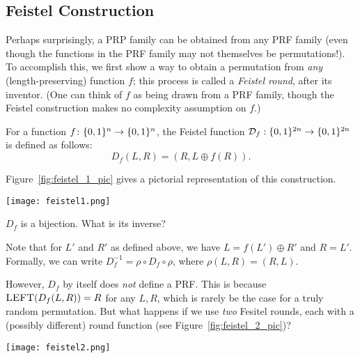 \documentclass[11pt]{article}
\begin{document}
\subsection{Feistel Construction}
\label{sec:feistel-construction}

Perhaps surprisingly, a PRP family can be obtained from any PRF family
(even though the functions in the PRF family may not themselves be
permutations!).  To accomplish this, we first show a way to obtain a
permutation from \emph{any} (length-preserving) function $f$; this
process is called a \emph{Feistel round}, after its inventor.  (One
can think of $f$ as being drawn from a PRF family, though the Feistel
construction makes no complexity assumption on $f$.)

\begin{definition}
  \label{def:feistel-round}
  For a function $f \colon \{0,1\}^{n} \to \{0,1\}^{n}$, the Feistel
  function $\mathcal D_f : \{0,1\}^{2n} \rightarrow \{0,1\}^{2n}$ is defined
  as follows:
  \[ D_f(L, R) = (R,L \oplus f(R) ). \]
\end{definition}

Figure~\ref{fig:feistel_1_pic} gives a pictorial representation of
this construction.

\begin{center}
  \centering
  \texttt{[image: feistel1.png]}
  \label{fig:feistel_1_pic}
\end{center}

\begin{question}
    \(D_f\) is a bijection. What is its inverse?
\end{question}
\begin{answer}
    Note that for $L'$ and $R'$ as defined above, we have $L = f(L')
    \oplus R'$ and $R = L'$.  Formally, we can write $D_{f}^{-1} = \rho
    \circ D_f \circ \rho$, where $\rho(L,R) = (R,L)$.
\end{answer}


However, $D_{f}$ by itself does \emph{not} define a PRF.  This is
because $\textsc{LEFT}( D_f(L,R) ) = R$ for any $L,R$, which is rarely
be the case for a truly random permutation.  But what happens if we
use \emph{two} Fesitel rounds, each with a (possibly different) round
function (see Figure~\ref{fig:feistel_2_pic})?

\begin{center}
  \centering
  \texttt{[image: feistel2.png]}
  \label{fig:feistel_2_pic}
\end{center}
\end{document}
